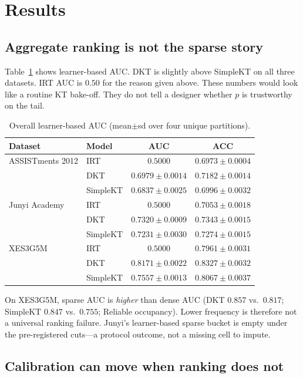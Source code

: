 \documentclass[journal,10pt,twocolumn]{IEEEtran}
\begin{document}
\section{Results}

\subsection{Aggregate ranking is not the sparse story}

Table~\ref{tab:overall} shows learner-based AUC. DKT is slightly above SimpleKT on all three datasets. IRT AUC is $0.50$ for the reason given above. These numbers would look like a routine KT bake-off. They do not tell a designer whether $p$ is trustworthy on the tail.

\begin{table}[!t]
\caption{Overall learner-based AUC (mean$\pm$sd over four unique partitions).}
\label{tab:overall}
\centering
\footnotesize
\begin{tabular}{llcc}
\toprule
Dataset & Model & AUC & ACC \\
\midrule
ASSISTments 2012 & IRT & $0.5000$ & $0.6973\pm0.0004$ \\
 & DKT & $0.6979\pm0.0014$ & $0.7182\pm0.0014$ \\
 & SimpleKT & $0.6837\pm0.0025$ & $0.6996\pm0.0032$ \\
\midrule
Junyi Academy & IRT & $0.5000$ & $0.7053\pm0.0018$ \\
 & DKT & $0.7320\pm0.0009$ & $0.7343\pm0.0015$ \\
 & SimpleKT & $0.7231\pm0.0030$ & $0.7274\pm0.0015$ \\
\midrule
XES3G5M & IRT & $0.5000$ & $0.7961\pm0.0031$ \\
 & DKT & $0.8171\pm0.0022$ & $0.8327\pm0.0032$ \\
 & SimpleKT & $0.7557\pm0.0013$ & $0.8067\pm0.0037$ \\
\bottomrule
\end{tabular}
\end{table}

On XES3G5M, sparse AUC is \emph{higher} than dense AUC (DKT $0.857$ vs.\ $0.817$; SimpleKT $0.847$ vs.\ $0.755$; Reliable occupancy). Lower frequency is therefore not a universal ranking failure. Junyi's learner-based sparse bucket is empty under the pre-registered cuts---a protocol outcome, not a missing cell to impute.

\subsection{Calibration can move when ranking does not}
\end{document}

